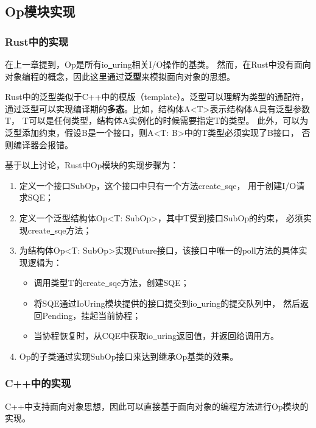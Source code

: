 \documentclass[supercite]{HustGraduPaper}
\theoremstyle{definition}
\begin{document}
\subsection{Op模块实现}
\subsubsection{Rust中的实现}
在上一章提到，Op是所有io\underline{~}uring相关I/O操作的基类。
然而，在Rust中没有面向对象编程的概念，因此这里通过\textbf{泛型}来模拟面向对象的思想。\par

Rust中的泛型类似于C++中的模版（template）。泛型可以理解为类型的通配符，
通过泛型可以实现编译期的\textbf{多态}。比如，结构体A<T>表示结构体A具有泛型参数T，
T可以是任何类型，结构体A实例化的时候需要指定T的类型。
此外，可以为泛型添加约束，假设B是一个接口，则A<T: B>中的T类型必须实现了B接口，
否则编译器会报错。\par

基于以上讨论，Rust中Op模块的实现步骤为：

\begin{enumerate}
  \item 定义一个接口SubOp，这个接口中只有一个方法create\underline{~}sqe，
    用于创建I/O请求SQE；
  \item 定义一个泛型结构体Op<T: SubOp>，其中T受到接口SubOp的约束，
    必须实现create\underline{~}sqe方法；
  \item 为结构体Op<T: SubOp>实现Future接口，该接口中唯一的poll方法的具体实现逻辑为：
    \begin{itemize}
      \item 调用类型T的create\underline{~}sqe方法，创建SQE；
      \item 将SQE通过IoUring模块提供的接口提交到io\underline{~}uring的提交队列中，
        然后返回Pending，挂起当前协程；
      \item 当协程恢复时，从CQE中获取io\underline{~}uring返回值，并返回给调用方。
    \end{itemize}
  \item Op的子类通过实现SubOp接口来达到继承Op基类的效果。
\end{enumerate}

\subsubsection{C++中的实现}

C++中支持面向对象思想，因此可以直接基于面向对象的编程方法进行Op模块的实现。\par
\end{document}
